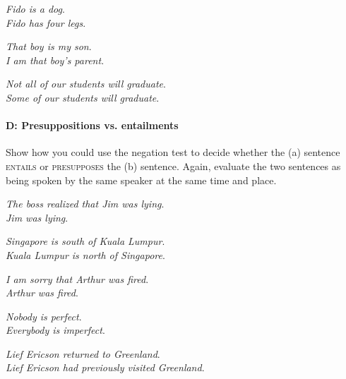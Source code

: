 {\ea%
\ea
\textit{Fido is a dog}.\\
\ex \textit{Fido has four legs}.
    \z\z
    
\ea%
\ea\textit{That boy is my son}.\\
\ex \textit{I am that boy’s parent}.
    \z
    \z
    
\ea%

\ea \textit{Not all of our students will graduate}.\\
\ex \textit{Some of our students will graduate}.
    \z \z

\paragraph*{D: Presuppositions vs. entailments}

Show how you could use the negation test to decide whether the (a) sentence \textsc{entails} or \textsc{presupposes} the (b) sentence. Again, evaluate the two sentences as being spoken by the same speaker at the same time and place.
 
\ea%
\ea \textit{The boss realized that Jim was lying}.\\
\ex \textit{Jim was lying}.\\
    \z
\z


\ea%
\ea \textit{Singapore is south of Kuala Lumpur}.\\
\ex \textit{Kuala Lumpur is north of Singapore}.
    \z
\z

\ea%
\ea \textit{I am sorry that Arthur was fired}.\\
\ex \textit{Arthur was fired}.
    \z
\z

\ea%
\ea \textit{Nobody is perfect}.\\
\ex \textit{Everybody is imperfect}.
    \z
\z

\ea%
\ea \textit{Lief Ericson returned to Greenland}.\\
\ex \textit{Lief Ericson had previously visited Greenland}.
    \z
\z
}